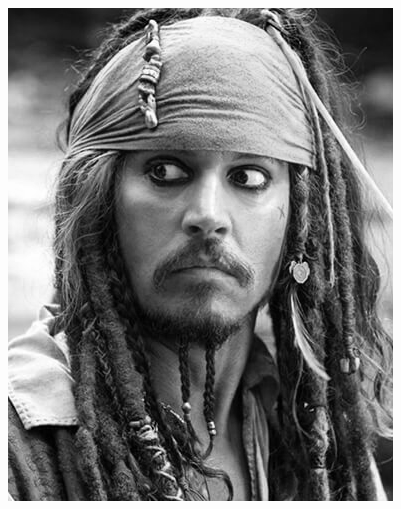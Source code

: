 \documentclass[11pt]{article}
\begin{document}
    \pagestyle{pagenumbering}
    \begin{minipage}[t]{0.22\textwidth}
        \includegraphics[valign=t,width=\textwidth]{jack-bw.png} %
    \end{minipage}\hspace{1em}\hfill
\end{document}
